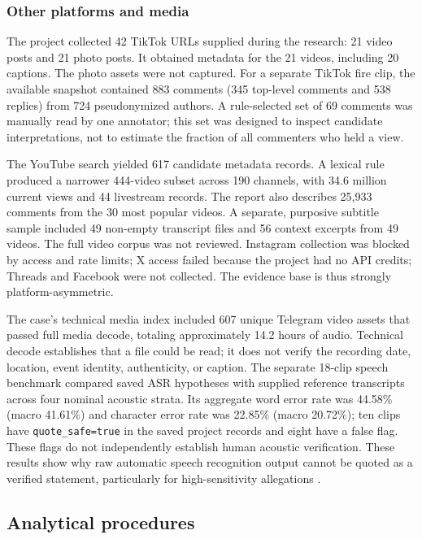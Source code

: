 \subsubsection{Other platforms and media}

The project collected 42 TikTok URLs supplied during the research: 21 video posts and 21 photo posts. It obtained metadata for the 21 videos, including 20 captions. The photo assets were not captured. For a separate TikTok fire clip, the available snapshot contained 883 comments (345 top-level comments and 538 replies) from 724 pseudonymized authors. A rule-selected set of 69 comments was manually read by one annotator; this set was designed to inspect candidate interpretations, not to estimate the fraction of all commenters who held a view.

The YouTube search yielded 617 candidate metadata records. A lexical rule produced a narrower 444-video subset across 190 channels, with 34.6 million current views and 44 livestream records. The report also describes 25,933 comments from the 30 most popular videos. A separate, purposive subtitle sample included 49 non-empty transcript files and 56 context excerpts from 49 videos. The full video corpus was not reviewed. Instagram collection was blocked by access and rate limits; X access failed because the project had no API credits; Threads and Facebook were not collected. The evidence base is thus strongly platform-asymmetric.

The case's technical media index included 607 unique Telegram video assets that passed full media decode, totaling approximately 14.2 hours of audio. Technical decode establishes that a file could be read; it does not verify the recording date, location, event identity, authenticity, or caption. The separate 18-clip speech benchmark compared saved ASR hypotheses with supplied reference transcripts across four nominal acoustic strata. Its aggregate word error rate was 44.58\% (macro 41.61\%) and character error rate was 22.85\% (macro 20.72\%); ten clips have \texttt{quote\_safe=true} in the saved project records and eight have a false flag. These flags do not independently establish human acoustic verification. These results show why raw automatic speech recognition output cannot be quoted as a verified statement, particularly for high-sensitivity allegations \citep{socialasr2026}.

\subsection{Analytical procedures}

